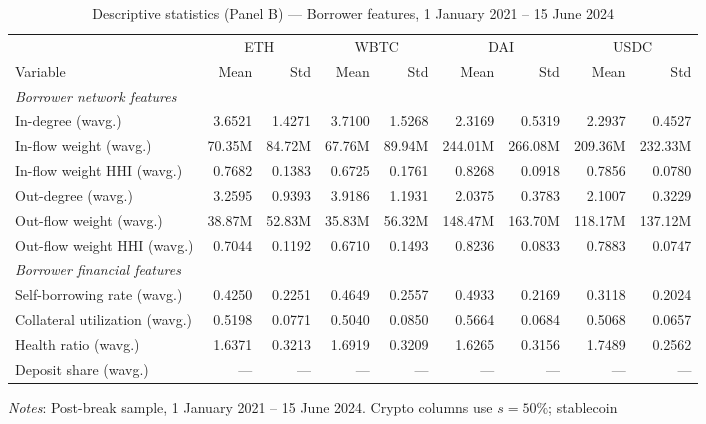 \documentclass[a4paper,UKenglish,cleveref, autoref, thm-restate]{informs3}
\begin{document}
\begin{table}[ht]
\centering
\begin{threeparttable}
\caption{Descriptive statistics (Panel B) ---
         Borrower features,
         1 January 2021 -- 15 June 2024}
\label{tab:desc_stats_b}
\footnotesize
\begin{tabular}{lrrrrrrrr}
\toprule
& \multicolumn{2}{c}{ETH} & \multicolumn{2}{c}{WBTC}
& \multicolumn{2}{c}{DAI} & \multicolumn{2}{c}{USDC} \\
\cmidrule(lr){2-3}\cmidrule(lr){4-5}
\cmidrule(lr){6-7}\cmidrule(lr){8-9}
Variable & Mean & Std & Mean & Std & Mean & Std & Mean & Std \\
\midrule
\multicolumn{9}{l}{\textit{Borrower network features}} \\
In-degree (wavg.) & 3.6521 & 1.4271 & 3.7100 & 1.5268 & 2.3169 & 0.5319 & 2.2937 & 0.4527 \\
In-flow weight (wavg.) & 70.35M & 84.72M & 67.76M & 89.94M & 244.01M & 266.08M & 209.36M & 232.33M \\
In-flow weight HHI (wavg.) & 0.7682 & 0.1383 & 0.6725 & 0.1761 & 0.8268 & 0.0918 & 0.7856 & 0.0780 \\
Out-degree (wavg.) & 3.2595 & 0.9393 & 3.9186 & 1.1931 & 2.0375 & 0.3783 & 2.1007 & 0.3229 \\
Out-flow weight (wavg.) & 38.87M & 52.83M & 35.83M & 56.32M & 148.47M & 163.70M & 118.17M & 137.12M \\
Out-flow weight HHI (wavg.) & 0.7044 & 0.1192 & 0.6710 & 0.1493 & 0.8236 & 0.0833 & 0.7883 & 0.0747 \\
\midrule
\multicolumn{9}{l}{\textit{Borrower financial features}} \\
Self-borrowing rate (wavg.) & 0.4250 & 0.2251 & 0.4649 & 0.2557 & 0.4933 & 0.2169 & 0.3118 & 0.2024 \\
Collateral utilization (wavg.) & 0.5198 & 0.0771 & 0.5040 & 0.0850 & 0.5664 & 0.0684 & 0.5068 & 0.0657 \\
Health ratio (wavg.) & 1.6371 & 0.3213 & 1.6919 & 0.3209 & 1.6265 & 0.3156 & 1.7489 & 0.2562 \\
Deposit share (wavg.) & --- & --- & --- & --- & --- & --- & --- & --- \\
\bottomrule
\end{tabular}
\begin{tablenotes}[flushleft]
\setlength{\itemsep}{0pt}
\setlength{\parsep}{0pt}
\scriptsize
\item \textit{Notes}: Post-break sample, 1 January 2021 --
15 June 2024. Crypto columns use $s = 50\%$; stablecoin

\end{tablenotes}
\end{threeparttable}
\end{table}
\end{document}
